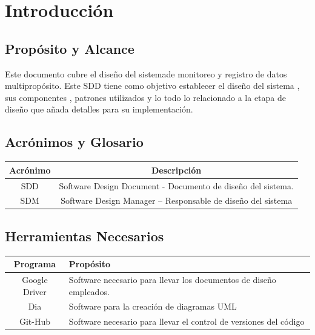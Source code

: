 \newpage
\section{\textcolor[gray]{.2}{Introducción}}
\subsection{\textcolor[gray]{.2}{Propósito y Alcance}}
Este documento cubre el diseño del sistemade monitoreo y registro de datos multipropósito. Este SDD tiene como objetivo establecer el diseño del sistema , sus componentes , patrones utilizados y lo todo lo relacionado a la etapa de diseño que añada detalles para su implementación. 

\subsection{\textcolor[gray]{.2}{Acrónimos y Glosario}}
\begin{table}[!h]
\begin{center}
\begin{tabular}{|c|c|}
\hline
\rowcolor[gray]{.8} Acrónimo & Descripción \\
\hline
SDD & Software Design Document - Documento de diseño del sistema. \\
\hline
SDM & Software Design Manager – Responsable de diseño del sistema\\
\hline
\end{tabular}
\end{center}
\end{table}

\subsection{\textcolor[gray]{.2}{Herramientas Necesarios}}
\begin{table}[!h]
\begin{center}
\begin{tabular}{|c|p{100mm}|}
\hline
\rowcolor[gray]{.8} Programa & Propósito \\
\hline
Google Driver & Software necesario para llevar los documentos de diseño empleados.\\
\hline
Dia & Software para la creación de diagramas UML\\
\hline
Git-Hub & Software necesario para llevar el control de versiones del código \\
\hline
\end{tabular}
\end{center}
\end{table}


